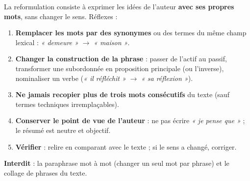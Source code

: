 \documentclass[11pt]{article}
\newcommand{\cle}[1]{{\popxbold\color{popdark}#1}}
\begin{document}
\begin{methode}
La \cle{reformulation} consiste à exprimer les idées de l'auteur \textbf{avec ses propres mots}, sans changer le sens. Réflexes :
\begin{enumerate}
\item \textbf{Remplacer les mots par des synonymes} ou des termes du même \cle{champ lexical} : \emph{« demeure »} $\rightarrow$ \emph{« maison »}.
\item \textbf{Changer la construction de la phrase} : passer de l'actif au passif, transformer une subordonnée en proposition principale (ou l'inverse), nominaliser un verbe (\emph{« il réfléchit »} $\rightarrow$ \emph{« sa réflexion »}).
\item \textbf{Ne jamais recopier plus de trois mots consécutifs} du texte (sauf termes techniques irremplaçables).
\item \textbf{Conserver le point de vue de l'auteur} : ne pas écrire \emph{« je pense que »} ; le résumé est neutre et objectif.
\item \textbf{Vérifier} : relire en comparant avec le texte ; si le sens a changé, corriger.
\end{enumerate}
\textbf{Interdit} : la paraphrase mot à mot (changer un seul mot par phrase) et le collage de phrases du texte.
\end{methode}
\end{document}

